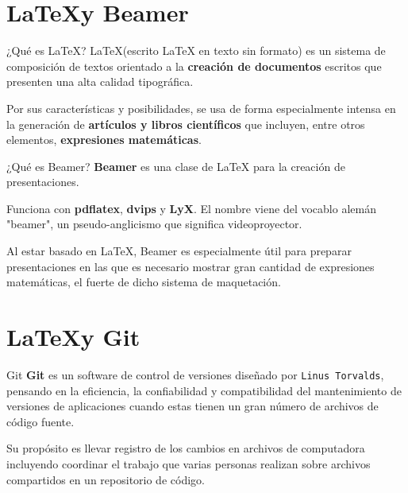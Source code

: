 
\section{\LaTeX y Beamer}

\begin{frame}[c]{¿Qué es \LaTeX?}
  \LaTeX (escrito LaTeX en texto sin formato) es un sistema de composición
  de textos orientado a la \textbf{creación de documentos} escritos que
  presenten una alta calidad tipográfica.

  \vspace{\baselineskip}
  Por sus características y posibilidades, se usa de forma especialmente
  intensa en la generación de \textbf{artículos y libros científicos} que
  incluyen, entre otros elementos, \textbf{expresiones matemáticas}.
\end{frame}

\begin{frame}[c]{¿Qué es Beamer?}
  \textbf{Beamer} es una clase de LaTeX para la creación de presentaciones.

  \vspace{\baselineskip}
  Funciona con \textbf{pdflatex}, \textbf{dvips} y \textbf{LyX}.
  El nombre viene del vocablo alemán "beamer", un pseudo-anglicismo que
  significa videoproyector.

  \vspace{\baselineskip}
  Al estar basado en LaTeX, Beamer es especialmente útil para preparar
  presentaciones en las que es necesario mostrar gran cantidad de expresiones
  matemáticas, el fuerte de dicho sistema de maquetación.
\end{frame}

\section{\LaTeX y Git}

\begin{frame}[c]{Git}
  \textbf{Git} es un software de control de versiones diseñado por
  \texttt{Linus Torvalds},
  pensando en la eficiencia, la confiabilidad y compatibilidad del
  mantenimiento de versiones de aplicaciones cuando estas tienen un
  gran número de archivos de código fuente.

  \vspace{\baselineskip}
  Su propósito es llevar registro de los cambios en archivos de computadora
  incluyendo coordinar el trabajo que varias personas realizan sobre archivos
  compartidos en un repositorio de código.
\end{frame}

